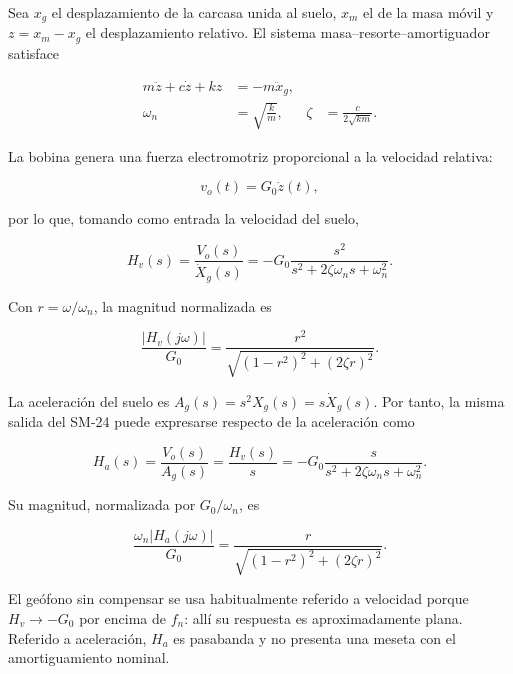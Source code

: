 Sea $x_g$ el desplazamiento de la carcasa unida al suelo, $x_m$ el de la masa móvil y
$z=x_m-x_g$ el desplazamiento relativo. El sistema masa--resorte--amortiguador satisface

\begin{equation}
\begin{aligned}
    m\ddot z+c\dot z+kz&=-m\ddot x_g,\\
    \omega_n&=\sqrt{\frac{k}{m}},
    &\zeta&=\frac{c}{2\sqrt{km}}.
\end{aligned}
    \label{eq:sm24-mecanico}
\end{equation}

La bobina genera una fuerza electromotriz proporcional a la velocidad relativa:

\begin{equation}
    v_o(t)=G_0\dot z(t),
\end{equation}

por lo que, tomando como entrada la velocidad del suelo,

\begin{equation}
    H_v(s)=\frac{V_o(s)}{\dot X_g(s)}
    =-G_0\frac{s^2}{s^2+2\zeta\omega_ns+\omega_n^2}.
    \label{eq:sm24-velocidad}
\end{equation}

Con $r=\omega/\omega_n$, la magnitud normalizada es

\begin{equation}
    \frac{|H_v(j\omega)|}{G_0}
    =\frac{r^2}{\sqrt{(1-r^2)^2+(2\zeta r)^2}}.
    \label{eq:sm24-magnitud}
\end{equation}

La aceleración del suelo es $A_g(s)=s^2X_g(s)=s\dot X_g(s)$. Por tanto, la misma salida
del SM-24 puede expresarse respecto de la aceleración como

\begin{equation}
    H_a(s)=\frac{V_o(s)}{A_g(s)}
    =\frac{H_v(s)}{s}
    =-G_0\frac{s}{s^2+2\zeta\omega_ns+\omega_n^2}.
    \label{eq:sm24-aceleracion}
\end{equation}

Su magnitud, normalizada por $G_0/\omega_n$, es

\begin{equation}
    \frac{\omega_n|H_a(j\omega)|}{G_0}
    =\frac{r}{\sqrt{(1-r^2)^2+(2\zeta r)^2}}.
    \label{eq:sm24-magnitud-aceleracion}
\end{equation}

El geófono sin compensar se usa habitualmente referido a velocidad porque
$H_v\rightarrow-G_0$ por encima de $f_n$: allí su respuesta es aproximadamente plana.
Referido a aceleración, $H_a$ es pasabanda y no presenta una meseta con el
amortiguamiento nominal.

